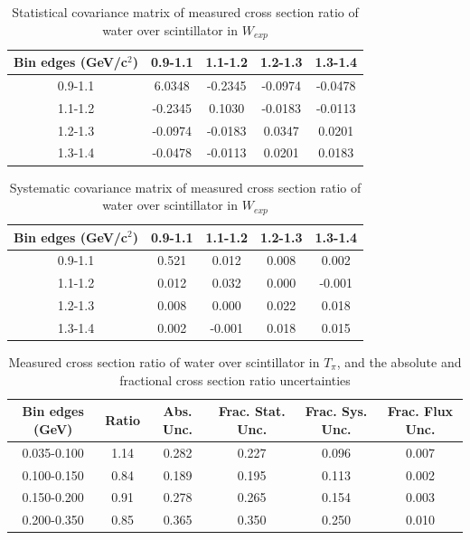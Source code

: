 \documentclass[../main.tex]{subfiles}
\begin{document}
\begin{table}
  \centering
  \renewcommand{\arraystretch}{1.15}
  \caption{Statistical covariance matrix of measured cross section ratio of water over scintillator in $W_{exp}$}
    \begin{tabular}{c||cccc}
      Bin edges (GeV/c${}^2$) & 0.9-1.1 & 1.1-1.2 & 1.2-1.3 & 1.3-1.4\\
      \hline
      \hline
      0.9-1.1 & 6.0348 & -0.2345 & -0.0974 & -0.0478\\
      1.1-1.2 & -0.2345 & 0.1030 & -0.0183 & -0.0113\\
      1.2-1.3 & -0.0974 & -0.0183 & 0.0347 & 0.0201\\
      1.3-1.4 & -0.0478 & -0.0113 & 0.0201 & 0.0183
    \end{tabular}
  \label{tbl:rationucleonnuc10Wb}
\end{table}
\begin{table}
  \centering
  \renewcommand{\arraystretch}{1.15}
  \caption{Systematic covariance matrix of measured cross section ratio of water over scintillator in $W_{exp}$}
    \begin{tabular}{c||cccc}
      Bin edges (GeV/c${}^2$) & 0.9-1.1 & 1.1-1.2 & 1.2-1.3 & 1.3-1.4\\
      \hline
      \hline
      0.9-1.1 & 0.521 & 0.012 & 0.008 & 0.002\\
      1.1-1.2 & 0.012 & 0.032 & 0.000 & -0.001\\
      1.2-1.3 & 0.008 & 0.000 & 0.022 & 0.018\\
      1.3-1.4 & 0.002 & -0.001 & 0.018 & 0.015
    \end{tabular}
  \label{tbl:rationucleonnuc10Wc}
\end{table}
\begin{table}
  \centering
  \renewcommand{\arraystretch}{1.15}
  \caption{Measured cross section ratio of water over scintillator in $T_{\pi}$, and the absolute and fractional cross section ratio uncertainties}
    \begin{tabular}{c||c|c||c|c|c}
      Bin edges (GeV) &  Ratio  &  Abs. Unc.  &  Frac. Stat. Unc.  &  Frac. Sys. Unc.  &  Frac. Flux Unc. \\
      \hline
      \hline
      0.035-0.100 & 1.14 & 0.282 & 0.227 & 0.096 & 0.007\\
      0.100-0.150 & 0.84 & 0.189 & 0.195 & 0.113 & 0.002\\
      0.150-0.200 & 0.91 & 0.278 & 0.265 & 0.154 & 0.003\\
      0.200-0.350 & 0.85 & 0.365 & 0.350 & 0.250 & 0.010
    \end{tabular}
  \label{tbl:rationucleonnuc10pion_ekina}
\end{table}
\end{document}
